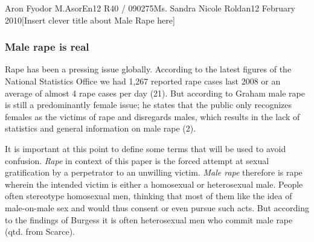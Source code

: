 \documentclass[12pt,letterpaper]{article}
\begin{document}
\begin{mla}{Aron Fyodor M.}{Asor}{En12 R40 / 090275}{Ms. Sandra Nicole Roldan}{12 February 2010}{[Insert clever title about Male Rape here]}

\subsubsection{Male rape is real}
%
%
\tab Rape has been a pressing issue globally. According to the latest figures of the National Statistics Office we had 1,267 reported rape cases last 2008 or an average of almost 4 rape cases per day (21). But according to Graham male rape is still a predominantly female issue; he states that the public only recognizes females as the victims of rape and disregards males, which results in the lack of statistics and general information on male rape (2).

%
%
It is important at this point to define some terms that will be used to avoid confusion. \textit{Rape} in context of this paper is the forced attempt at sexual gratification by a perpetrator to an unwilling victim. \textit{Male rape} therefore is rape wherein the intended victim is either a homosexual or heterosexual male. People often stereotype homosexual men, thinking that most of them like the idea of male-on-male sex and would thus consent or even pursue such acts. But according to the findings of Burgess it is often heterosexual men who commit male rape (qtd. from Scarce). 

%
%











\end{mla}
\end{document}
